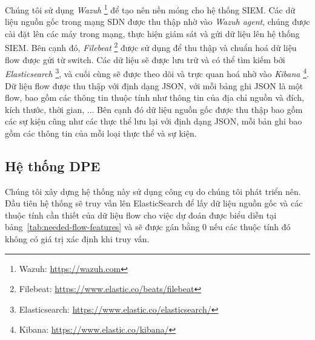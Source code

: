 Chúng tôi sử dụng \textit{Wazuh} \footnote{Wazuh: \url{https://wazuh.com}} để tạo nên nền móng cho hệ thống SIEM. Các dữ liệu nguồn gốc trong mạng SDN được thu thập nhờ vào \textit{Wazuh agent}, chúng được cài đặt lên các máy trong mạng, thực hiện giám sát và gửi dữ liệu lên hệ thống SIEM. Bên cạnh đó, \textit{Filebeat} \footnote{Filebeat: \url{https://www.elastic.co/beats/filebeat}} được sử dụng để thu thập và chuẩn hoá dữ liệu flow được gửi từ switch. Các dữ liệu sẽ được lưu trữ và có thể tìm kiếm bởi \textit{Elasticsearch} \footnote{Elasticsearch: \url{https://www.elastic.co/elasticsearch/}}, và cuối cùng sẽ được theo dõi và trực quan hoá nhờ vào \textit{Kibana} \footnote{Kibana: \url{https://www.elastic.co/kibana/}}.
\bigbreak\noindent
Dữ liệu flow được thu thập với định dạng JSON, với mỗi bảng ghi JSON là một flow, bao gồm các thông tin thuộc tính như thông tin của địa chỉ nguồn và đích, kích thước, thời gian, ... Bên cạnh đó dữ liệu nguồn gốc được thu thập bao gồm các sự kiện cũng như các thực thể lưu lại với định dạng JSON, mỗi bản ghi bao gồm các thông tin của mỗi loại thực thể và sự kiện.

\subsection{Hệ thống DPE}

Chúng tôi xây dựng hệ thống này sử dụng công cụ do chúng tôi phát triển nên. Đầu tiên hệ thống sẽ truy vấn lên ElasticSearch để lấy dữ liệu nguồn gốc và các thuộc tính cần thiết của dữ liệu flow cho việc dự đoán được biểu diễn tại bảng~\ref{tab:needed-flow-features} và sẽ được gán bằng 0 nếu các thuộc tính đó không có giá trị xác định khi truy vấn.

